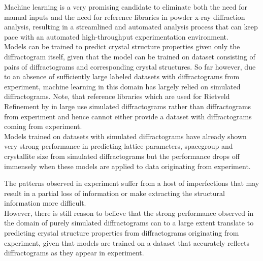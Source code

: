 Machine learning is a very promising candidate to eliminate both the need for manual inputs and the need for reference
libraries in powder x-ray diffraction analysis, resulting in a streamlined and automated analysis process that can
keep pace with an automated high-throughput experimentation environment. \\

Models can be trained to predict crystal structure properties given only the diffractogram itself, given that
the model can be trained on dataset consisting of pairs of diffractograms and corresponding crystal structures.
So far however, due to an absence of sufficiently large labeled datasets with diffractograms from experiment,
machine learning in this domain has largely relied on simulated diffractograms.
Note, that reference libraries which are used for Rietveld Refinement by in large use simulated diffractograms
rather than diffractograms from experiment and hence cannot either provide a dataset with diffractograms coming
from experiment. \\

Models trained on datasets with simulated diffractograms have already shown very strong performance in predicting
lattice parameters, spacegroup and crystallite size from simulated diffractograms but the performance drops off immensely when these models are applied to data originating from experiment.

The patterns observed in experiment suffer from a host of imperfections that may result in a partial loss of information or make extracting the structural information more difficult. \\
However, there is still reason to believe that the strong performance observed in the domain of purely simulated diffractograms can to a large extent translate to predicting crystal structure properties from diffractograms originating from experiment, given that models are trained on a dataset that accurately reflects diffractograms as they appear in experiment.

